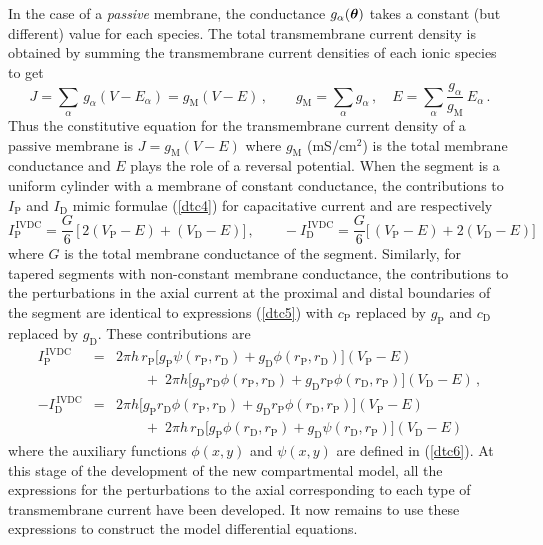In the case of a \emph{passive} membrane, the conductance
$g_\alpha(\boldsymbol{\theta})$ takes a constant (but different) value for
each species. The total transmembrane current density is obtained
by summing the transmembrane current densities of each ionic
species to get
\begin{equation}\label{dtc8}
J=\sum_\alpha\, g_\alpha(V-E_\alpha)= g_\mathrm{M}(V-E)\,,
\qquad g_\mathrm{M}=\sum_\alpha g_\alpha\,,\quad
E=\sum_\alpha \frac{g_\alpha}{g_\mathrm{M}}\, E_\alpha\,.
\end{equation}
Thus the constitutive equation for the transmembrane current
density of a passive membrane is $J=g_\mathrm{M}(V-E)$ where
$g_\mathrm{M}$ (mS/cm$^2$) is the total membrane conductance and
$E$ plays the role of a reversal potential. When the segment is a
uniform cylinder with a membrane of constant conductance, the
contributions to $I_\mathrm{P}$ and $I_\mathrm{D}$ mimic formulae
(\ref{dtc4}) for capacitative current and are respectively
\begin{equation}\label{dtc10}
I^\mathrm{\,IVDC}_\mathrm{P} = \frac{G}{6}\,
\Big[\,2(V_\mathrm{P}-E)+(V_\mathrm{D}-E)\Big]\,,\qquad
-I^\mathrm{\,IVDC}_\mathrm{D} = \frac{G}{6}
\Big[\,(V_\mathrm{P}-E)+2(V_\mathrm{D}-E)\Big]
\end{equation}
where $G$ is the total membrane conductance of the segment.
Similarly, for tapered segments with non-constant membrane
conductance, the contributions to the perturbations in the axial
current at the proximal and distal boundaries of the segment are
identical to expressions (\ref{dtc5}) with $c_\mathrm{P}$ replaced
by $g_\mathrm{P}$ and $c_\mathrm{D}$ replaced by $g_\mathrm{D}$.
These contributions are
\begin{equation}\label{dtc9}
\begin{array}{rcl}
I^\mathrm{\,IVDC}_\mathrm{P} & = & 2\pi h
\,r_\mathrm{P}\Big[g_\mathrm{P}\psi(r_\mathrm{P},r_\mathrm{D})
+g_\mathrm{D}\phi(r_\mathrm{P},r_\mathrm{D})\Big]
(V_\mathrm{P}-E)\\[5pt]
&&\qquad+\;2\pi h\Big[g_\mathrm{P}r_\mathrm{D}
\phi(r_\mathrm{P},r_\mathrm{D})+g_\mathrm{D}r_\mathrm{P}
\phi(r_\mathrm{D},r_\mathrm{P})\Big](V_\mathrm{D}-E)\,,\\[10pt]
-I^\mathrm{\,IVDC}_\mathrm{D} & = & 2\pi h
\Big[g_\mathrm{P}r_\mathrm{D}\phi(r_\mathrm{P},r_\mathrm{D})
+g_\mathrm{D}r_\mathrm{P}\phi(r_\mathrm{D},r_\mathrm{P})\Big]
(V_\mathrm{P}-E)\\[5pt]
&&\qquad+\;2\pi h\,r_\mathrm{D}\Big[g_\mathrm{P}
\phi(r_\mathrm{D},r_\mathrm{P})+g_\mathrm{D}
\psi(r_\mathrm{D},r_\mathrm{P})\Big](V_\mathrm{D}-E)
\end{array}
\end{equation}
where the auxiliary functions $\phi(x,y)$ and $\psi(x,y)$ are
defined in (\ref{dtc6}). At this stage of the development of the
new compartmental model, all the expressions for the perturbations
to the axial corresponding to each type of transmembrane current
have been developed. It now remains to use these expressions to
construct the model differential equations.

